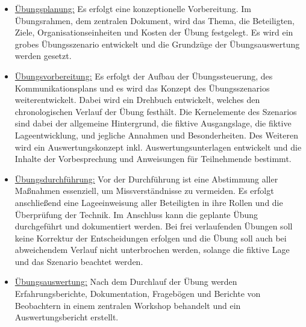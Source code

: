 \begin{itemize}
    \item \underline{Übungsplanung:}
    Es erfolgt eine konzeptionelle Vorbereitung. Im Übungsrahmen, dem zentralen Dokument, wird das Thema, die Beteiligten, Ziele, Organisationseinheiten und Kosten der Übung festgelegt. Es wird ein grobes Übungsszenario entwickelt und die Grundzüge der Übungsauswertung werden gesetzt.  \
    
    \item \underline{Übungsvorbereitung:}
    Es erfolgt der Aufbau der Übungssteuerung, des Kommunikationsplans und es wird das Konzept des Übungsszenarios weiterentwickelt. Dabei wird ein Drehbuch entwickelt, welches den chronologischen Verlauf der Übung festhält. Die Kernelemente des Szenarios sind dabei der allgemeine Hintergrund, die fiktive Ausgangslage, die fiktive Lageentwicklung, und jegliche Annahmen und Besonderheiten. Des Weiteren wird ein Auswertungskonzept inkl. Auswertungsunterlagen entwickelt und die Inhalte der Vorbesprechung und Anweisungen für Teilnehmende bestimmt.\

    \item \underline{Übungsdurchführung:}
    Vor der Durchführung ist eine Abstimmung aller Maßnahmen essenziell, um Missverständnisse zu vermeiden. Es erfolgt anschließend eine Lageeinweisung aller Beteiligten in ihre Rollen und die Überprüfung der Technik. Im Anschluss kann die geplante Übung durchgeführt und dokumentiert werden. 
    Bei frei verlaufenden Übungen soll keine Korrektur der Entscheidungen erfolgen und die Übung soll auch bei abweichendem Verlauf nicht unterbrochen werden, solange die fiktive Lage und das Szenario beachtet werden.
\

    \item \underline{Übungsauswertung:}
    Nach dem Durchlauf der Übung werden Erfahrungsberichte, Dokumentation, Fragebögen und Berichte von Beobachtern in einem zentralen Workshop behandelt und ein Auswertungsbericht erstellt.\\    

\end{itemize} 


